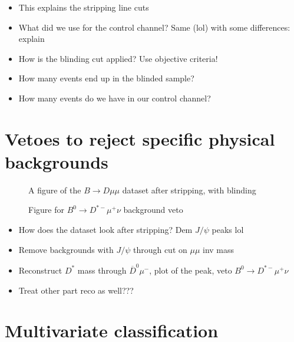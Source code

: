 \begin{itemize}
  \item This explains the stripping line cuts
  \item What did we use for the control channel? Same (lol) with some differences: explain
  \item How is the blinding cut applied? Use objective criteria!
  \item How many events end up in the blinded sample?
  \item How many events do we have in our control channel?
\end{itemize}

\section{Vetoes to reject specific physical backgrounds}

\begin{figure}
  \centering
  \caption{A figure of the $B\to Dμμ$ dataset after stripping, with blinding}
\end{figure}

\begin{figure}
  \centering
  \caption{Figure for $B^0\to D^{*-}μ^+ν$ background veto}
\end{figure}

\begin{itemize}
  \item How does the dataset look after stripping? Dem $J/ψ$ peaks lol
  \item Remove backgrounds with $J/ψ$ through cut on $μμ$ inv mass
  \item Reconstruct $D^*$ mass through $\overline{D}^0μ^-$, plot of the peak, veto $B^0\to D^{*-}μ^+ν$
  \item Treat other part reco as well???
\end{itemize}

\section{Multivariate classification}

